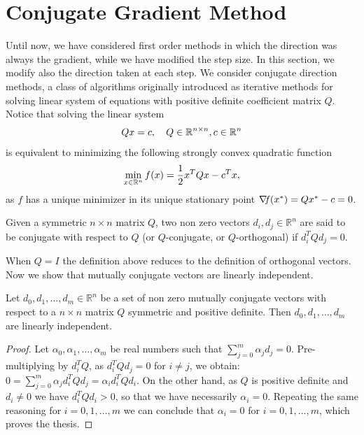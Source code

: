 \documentclass[10pt,a4paper]{article}
\begin{document}
\section{Conjugate Gradient Method}
Until now, we have considered first order methods in which the direction was always the gradient, while we have modified the step size. In this section, we modify also the direction taken at each step. 
We consider conjugate direction methods, a class of algorithms originally introduced as iterative methods for solving linear system of equations with positive definite coefficient matrix $Q$. Notice that solving the linear system
\begin{equation}\label{eq:equality_system}
	Qx=c, \quad Q\in \mathbb{R}^{n\times n}, c\in \mathbb{R}^n
\end{equation}
is equivalent to minimizing the following strongly convex quadratic function
\begin{equation*}
	\min_{x\in \mathbb{R}^n} f(x) = \frac{1}{2}x^TQx - c^Tx,
\end{equation*}
as $f$ has a unique minimizer in its unique stationary point $\operatorname*{\mathit{\nabla \!f}} (x^*)= Qx^*-c = 0$.
\begin{definition}
	Given a symmetric $n \times n$ matrix $Q$, two non zero vectors $d_i, d_j \in \mathbb{R}^n$ are said to be conjugate with respect to $Q$ (or $Q$-conjugate, or $Q$-orthogonal) if $d_i^T Q d_j = 0$.
\end{definition}
\noindent When $Q = I$ the definition above reduces to the definition of orthogonal vectors. Now we show that mutually conjugate vectors are linearly independent.
\begin{proposition}
	Let $d_0, d_1, \ldots, d_m \in \mathbb{R}^n$ be a set of non zero mutually conjugate vectors with respect to a $n \times n$ matrix $Q$ symmetric and positive definite. Then $d_0, d_1, \ldots, d_m$ are linearly independent.
\end{proposition}
\begin{proof}
	Let $\alpha_0, \alpha_1, \ldots, \alpha_m$ be real numbers such that $\sum_{j=0}^m \alpha_j d_j = 0$. Pre-multiplying by $d_i^T Q$, as $d_i^T Q d_j = 0$ for $i \neq j$, we obtain: $0 = \sum_{j=0}^m \alpha_j d_i^T Q d_j = \alpha_i d_i^T Q d_i$. On the other hand, as $Q$ is positive definite and $d_i \neq 0$ we have $d_i^T Q d_i > 0$, so that we have necessarily $\alpha_i = 0$. Repeating the same reasoning for $i = 0, 1, \ldots, m$ we can conclude that $\alpha_i = 0$ for $i = 0, 1, \ldots, m$, which proves the thesis. 
\end{proof}
\end{document}
